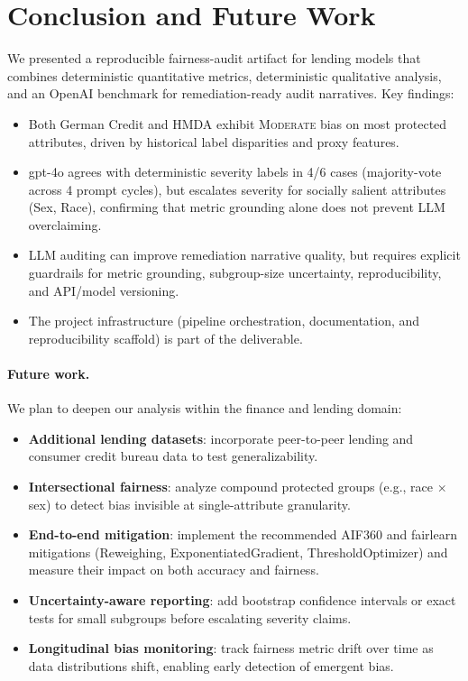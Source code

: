 \documentclass[11pt,a4paper]{article}
\begin{document}
\section{Conclusion and Future Work}

We presented a reproducible fairness-audit artifact for lending models that
combines deterministic quantitative metrics, deterministic qualitative
analysis, and an OpenAI benchmark for remediation-ready audit narratives. Key
findings:
\begin{itemize}[nosep]
  \item Both German Credit and HMDA exhibit \textsc{Moderate} bias on
        most protected attributes, driven by historical label disparities
        and proxy features.
  \item gpt-4o agrees with deterministic severity labels in 4/6 cases
        (majority-vote across 4 prompt cycles), but escalates severity for
        socially salient attributes (Sex, Race), confirming that metric
        grounding alone does not prevent LLM overclaiming.
  \item LLM auditing can improve remediation narrative quality, but requires
        explicit guardrails for metric grounding, subgroup-size uncertainty,
        reproducibility, and API/model versioning.
  \item The project infrastructure (pipeline orchestration, documentation, and
        reproducibility scaffold) is part of the deliverable.
\end{itemize}

\paragraph{Future work.}
We plan to deepen our analysis within the finance and lending domain:
\begin{itemize}[nosep]
  \item \textbf{Additional lending datasets}: incorporate peer-to-peer
        lending and consumer credit bureau data to test generalizability.
  \item \textbf{Intersectional fairness}: analyze compound protected groups
        (e.g., race $\times$ sex) to detect bias invisible at single-attribute
        granularity.
  \item \textbf{End-to-end mitigation}: implement the recommended AIF360
        and fairlearn mitigations (Reweighing, ExponentiatedGradient,
        ThresholdOptimizer) and measure their impact on both accuracy and
        fairness.
  \item \textbf{Uncertainty-aware reporting}: add bootstrap confidence
        intervals or exact tests for small subgroups before escalating
        severity claims.
  \item \textbf{Longitudinal bias monitoring}: track fairness metric drift
        over time as data distributions shift, enabling early detection of
        emergent bias.
\end{itemize}
\end{document}
